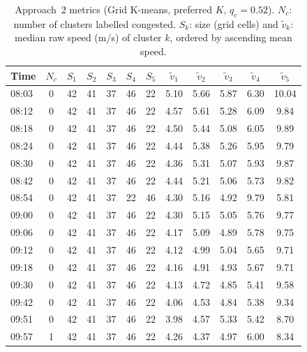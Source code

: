 \documentclass[11pt,a4paper]{article}
\begin{document}
\begin{table}[H]
  \centering
  \small
  \caption{Approach~2 metrics (Grid K-means, preferred $K$, $q_c = 0.52$).
    $N_c$: number of clusters labelled congested.  $S_k$: size (grid cells) and
    $\tilde{v}_k$: median raw speed (m/s) of cluster $k$, ordered by ascending
    mean speed.}
  \label{tab:km_metrics}
  \setlength{\tabcolsep}{4pt}
  \begin{tabular}{l c ccccc ccccc}
    \toprule
    Time & $N_c$ & $S_1$ & $S_2$ & $S_3$ & $S_4$ & $S_5$
         & $\tilde{v}_1$ & $\tilde{v}_2$ & $\tilde{v}_3$ & $\tilde{v}_4$
         & $\tilde{v}_5$ \\
    \midrule
    08:03 & 0 & 42 & 41 & 37 & 46 & 22 &  5.10 &  5.66 &  5.87 &  6.30 & 10.04 \\
    08:12 & 0 & 42 & 41 & 37 & 46 & 22 &  4.57 &  5.61 &  5.28 &  6.09 &  9.84 \\
    08:18 & 0 & 42 & 41 & 37 & 46 & 22 &  4.50 &  5.44 &  5.08 &  6.05 &  9.89 \\
    08:24 & 0 & 42 & 41 & 37 & 46 & 22 &  4.44 &  5.38 &  5.26 &  5.95 &  9.79 \\
    08:30 & 0 & 42 & 41 & 37 & 46 & 22 &  4.36 &  5.31 &  5.07 &  5.93 &  9.87 \\
    08:42 & 0 & 42 & 41 & 37 & 46 & 22 &  4.44 &  5.21 &  5.06 &  5.73 &  9.82 \\
    08:54 & 0 & 42 & 41 & 37 & 22 & 46 &  4.30 &  5.16 &  4.92 &  9.79 &  5.81 \\
    09:00 & 0 & 42 & 41 & 37 & 46 & 22 &  4.30 &  5.15 &  5.05 &  5.76 &  9.77 \\
    09:06 & 0 & 42 & 41 & 37 & 46 & 22 &  4.17 &  5.09 &  4.89 &  5.78 &  9.75 \\
    09:12 & 0 & 42 & 41 & 37 & 46 & 22 &  4.12 &  4.99 &  5.04 &  5.65 &  9.71 \\
    09:18 & 0 & 42 & 41 & 37 & 46 & 22 &  4.16 &  4.91 &  4.93 &  5.67 &  9.71 \\
    09:30 & 0 & 42 & 41 & 37 & 46 & 22 &  4.13 &  4.72 &  4.85 &  5.41 &  9.58 \\
    09:42 & 0 & 42 & 41 & 37 & 46 & 22 &  4.06 &  4.53 &  4.84 &  5.38 &  9.34 \\
    09:51 & 0 & 42 & 41 & 37 & 46 & 22 &  3.98 &  4.57 &  5.33 &  5.42 &  8.70 \\
    09:57 & 1 & 42 & 41 & 37 & 46 & 22 &  4.26 &  4.37 &  4.97 &  6.00 &  8.34 \\
    \bottomrule
  \end{tabular}
\end{table}
\end{document}
